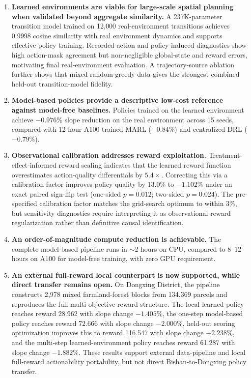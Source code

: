 \documentclass[11pt]{article}
\begin{document}
\begin{enumerate}
\item \textbf{Learned environments are viable for large-scale spatial planning when validated beyond aggregate similarity.} A 237K-parameter transition model trained on 12{,}000 real-environment transitions achieves 0.9998 cosine similarity with real environment dynamics and supports effective policy training. Recorded-action and policy-induced diagnostics show high action-mask agreement but non-negligible global-state and reward errors, motivating final real-environment evaluation. A trajectory-source ablation further shows that mixed random-greedy data gives the strongest combined held-out transition-model fidelity.

\item \textbf{Model-based policies provide a descriptive low-cost reference against model-free baselines.} Policies trained on the learned environment achieve $-0.976\%$ slope reduction on the real environment across 15 seeds, compared with 12-hour A100-trained MARL ($-0.84\%$) and centralized DRL ($-0.79\%$).

\item \textbf{Observational calibration addresses reward exploitation.} Treatment-effect-informed reward scaling indicates that the learned reward function overestimates action-quality differentials by $5.4\times$. Correcting this via a calibration factor improves policy quality by 13.0\% to $-1.102\%$ under an exact paired sign-flip test (one-sided $p=0.012$; two-sided $p=0.024$). The pre-specified calibration factor matches the grid-search optimum to within 3\%, but sensitivity diagnostics require interpreting it as observational reward regularization rather than definitive causal identification.

\item \textbf{An order-of-magnitude compute reduction is achievable.} The complete model-based pipeline runs in $\sim$2 hours on CPU, compared to 8--12 hours on A100 for model-free training, with zero GPU requirement.

\item \textbf{An external full-reward local counterpart is now supported, while direct transfer remains open.} On Dongxing District, the pipeline constructs 2{,}978 mixed farmland-forest blocks from 134{,}369 parcels and reproduces the full multi-objective reward structure. The local learned policy reaches reward 28.962 with slope change $-1.405\%$, the one-step model-based policy reaches reward 72.666 with slope change $-2.000\%$, held-out scoring optimization improves this to reward 116.547 with slope change $-2.238\%$, and the multi-step learned-environment policy reaches reward 61.287 with slope change $-1.882\%$. These results support external data-pipeline and local full-reward actionability portability, but not direct Bishan-to-Dongxing policy transfer.


\end{enumerate}
\end{document}
